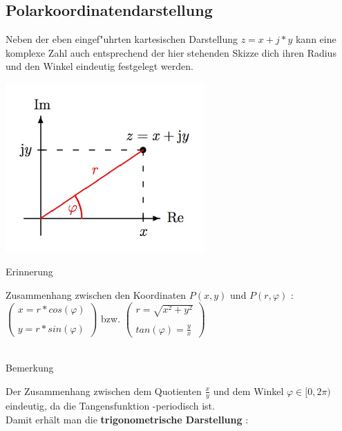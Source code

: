 	\subsection{Polarkoordinatendarstellung}

Neben der eben eingef"uhrten kartesischen Darstellung $z =x+j*y$ kann eine komplexe Zahl auch entsprechend der hier stehenden Skizze dich ihren Radius  und den Winkel  eindeutig festgelegt werden.

\includegraphics[width=3in]{kap6/komplexezahlen4}

\begin{Bemerkung}
Erinnerung\\
\end{Bemerkung}

Zusammenhang zwischen den Koordinaten $P(x,y)$ und $P(r,\varphi)$ :\\

$
\begin{pmatrix}
x=r*cos(\varphi)\\
\\
y=r*sin(\varphi)
\end{pmatrix}
$
bzw.
$
\begin{pmatrix}
r= \sqrt{x^2+y^2}\\
\\
tan(\varphi) = \frac{y}{x}
\end{pmatrix}
$
\\
\\

\begin{Bemerkung}
Bemerkung\\
\end{Bemerkung}

Der Zusammenhang zwischen dem Quotienten $\frac{x}{y}$ und dem Winkel $\varphi \in [0,2\pi)$ eindeutig, da die Tangensfunktion -periodisch ist.\\
Damit erhält man die \textbf{trigonometrische Darstellung} :\\

